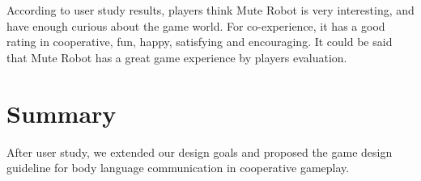 \documentclass{sigchi}
\begin{document}

According to user study results, players think Mute Robot is very interesting, and have enough curious about the game world. For co-experience, it has a good rating in cooperative, fun, happy, satisfying and encouraging. It could be said that Mute Robot has a great game experience by players evaluation. 


\section{Summary}

After user study, we extended our design goals and proposed the game design guideline for body language communication in cooperative gameplay.
\end{document}
